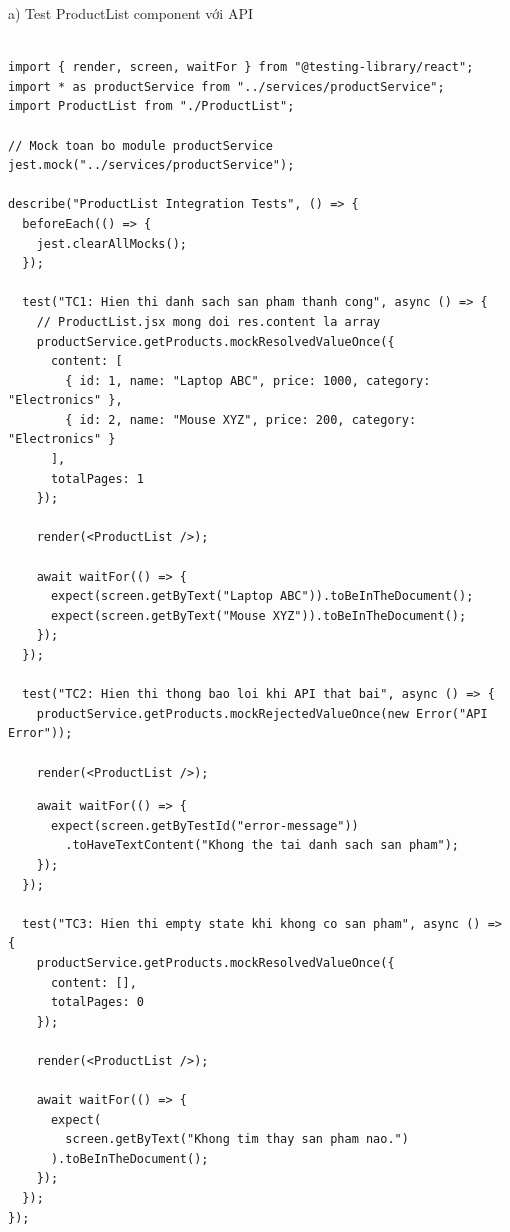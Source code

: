 \documentclass[a4paper,12pt]{article}
\begin{document}
a) Test ProductList component với API
\begin{tcolorbox}[breakable, colback=green!5,colframe=black!50,title=ProductList Integration Tests]
\begin{lstlisting}

import { render, screen, waitFor } from "@testing-library/react";
import * as productService from "../services/productService";
import ProductList from "./ProductList";

// Mock toan bo module productService
jest.mock("../services/productService");

describe("ProductList Integration Tests", () => {
  beforeEach(() => {
    jest.clearAllMocks();
  });

  test("TC1: Hien thi danh sach san pham thanh cong", async () => {
    // ProductList.jsx mong doi res.content la array
    productService.getProducts.mockResolvedValueOnce({
      content: [
        { id: 1, name: "Laptop ABC", price: 1000, category: "Electronics" },
        { id: 2, name: "Mouse XYZ", price: 200, category: "Electronics" }
      ],
      totalPages: 1
    });

    render(<ProductList />);

    await waitFor(() => {
      expect(screen.getByText("Laptop ABC")).toBeInTheDocument();
      expect(screen.getByText("Mouse XYZ")).toBeInTheDocument();
    });
  });

  test("TC2: Hien thi thong bao loi khi API that bai", async () => {
    productService.getProducts.mockRejectedValueOnce(new Error("API Error"));

    render(<ProductList />);
\end{lstlisting}
\end{tcolorbox}
\begin{tcolorbox}[breakable, colback=green!5,colframe=black!50,title=ProductList Integration Tests]
\begin{lstlisting}
    await waitFor(() => {
      expect(screen.getByTestId("error-message"))
        .toHaveTextContent("Khong the tai danh sach san pham");
    });
  });

  test("TC3: Hien thi empty state khi khong co san pham", async () => {
    productService.getProducts.mockResolvedValueOnce({
      content: [],
      totalPages: 0
    });

    render(<ProductList />);

    await waitFor(() => {
      expect(
        screen.getByText("Khong tim thay san pham nao.")
      ).toBeInTheDocument();
    });
  });
});
\end{lstlisting}
\end{tcolorbox}
\end{document}
